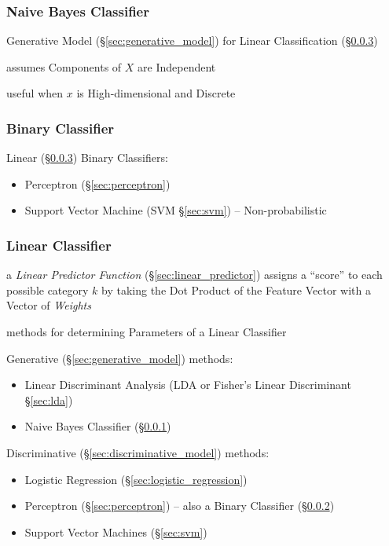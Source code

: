 \subsubsection{Naive Bayes Classifier}\label{sec:naive_bayes}

Generative Model (\S\ref{sec:generative_model}) for Linear Classification
(\S\ref{sec:linear_classifier})

assumes Components of $X$ are Independent

useful when $x$ is High-dimensional and Discrete



\subsubsection{Binary Classifier}\label{sec:binary_classifier}

Linear (\S\ref{sec:linear_classifier}) Binary Classifiers:
\begin{itemize}
  \item Perceptron (\S\ref{sec:perceptron})
  \item Support Vector Machine (SVM \S\ref{sec:svm}) -- Non-probabilistic
\end{itemize}



\subsubsection{Linear Classifier}\label{sec:linear_classifier}

a \emph{Linear Predictor Function} (\S\ref{sec:linear_predictor}) assigns a
``score'' to each possible category $k$ by taking the Dot Product of the Feature
Vector with a Vector of \emph{Weights}

methods for determining Parameters of a Linear Classifier

Generative (\S\ref{sec:generative_model}) methods:
\begin{itemize}
  \item Linear Discriminant Analysis (LDA or Fisher's Linear Discriminant
    \S\ref{sec:lda})
  \item Naive Bayes Classifier (\S\ref{sec:naive_bayes})
\end{itemize}

Discriminative (\S\ref{sec:discriminative_model}) methods:
\begin{itemize}
  \item Logistic Regression (\S\ref{sec:logistic_regression})
  \item Perceptron (\S\ref{sec:perceptron}) -- also a Binary Classifier
    (\S\ref{sec:binary_classifier})
  \item Support Vector Machines (\S\ref{sec:svm})
\end{itemize}

